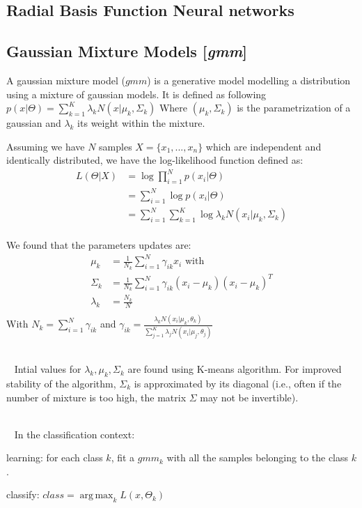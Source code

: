 \documentclass[11pt]{article}
\newcommand{\nllref}[1]{[\small{\textit{#1}}]}
\DeclareMathOperator*{\argmax}{arg\,max}
\begin{document}
\subsection{Radial Basis Function Neural networks}
\subsection{Gaussian Mixture Models \nllref{gmm}}
A gaussian mixture model ($gmm$) is a generative model modelling a distribution using a mixture of gaussian models. It is defined as following $p(x|\Theta)= \sum_{k=1}^K \lambda _k N(x|\mu _k, \Sigma _k)$ Where $(\mu _k, \Sigma _k)$ is the parametrization of a gaussian and $\lambda _k$ its weight within the mixture.

Assuming we have $N$ samples $X=\{x_1,...,x_n\}$ which are independent and identically distributed, we have the log-likelihood function defined as:
\begin{align*}
L(\Theta | X)&=\log \prod_{i=1}^N p(x_i|\Theta) \\
&=\sum_{i=1}^N \log p(x_i|\Theta) \\
&=\sum_{i=1}^N \sum_{k=1}^K \log \lambda _k N(x_i|\mu _k, \Sigma _k) \\
\end{align*}

We found that the parameters updates are:
\begin{align*}
\mu _ k &= \frac{1}{N_k} \sum_{i=1}^N \gamma _{ik} x_i \text{~with~} \\
\Sigma _k &= \frac{1}{N_k} \sum _{i=1}^N \gamma _{ik}(x_i-\mu _k)(x_i-\mu _k)^T \\
\lambda _k &= \frac{N_k}{N} \\
\end{align*}
With $N_k = \sum _{i=1}^N \gamma _{ik}$ and $\gamma _{ik} = \frac{\lambda_k N(x_i| \mu _k, \theta _k)}{\sum _{j=1}^K \lambda _j N(x_i| \mu _j, \theta _j)}$

~\\~
Intial values for $\lambda_k, \mu_k, \Sigma_k$ are found using K-means algorithm. For improved stability of the algorithm, $\Sigma_k$ is approximated by its diagonal (i.e., often if the number of mixture is too high, the matrix $\Sigma$ may not be invertible).

~\\~
In the classification context:
\begin{compactitem}
\item learning: for each class $k$, fit a $gmm_k$ with all the samples belonging to the class $k$.
\item classify: $class=\argmax_k L(x,\Theta_k)$
\end{compactitem}
\end{document}
